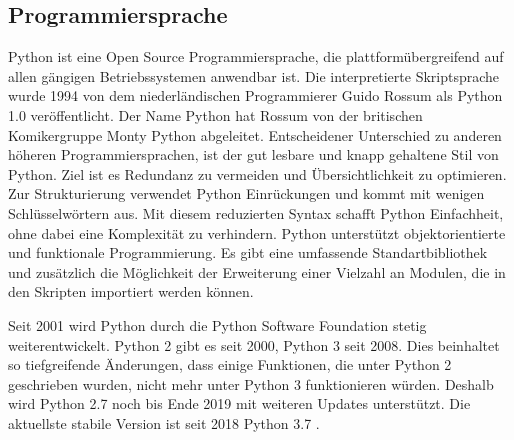 \subsection{Programmiersprache}
Python ist eine Open Source Programmiersprache, die plattformübergreifend auf allen gängigen Betriebssystemen anwendbar ist. Die interpretierte Skriptsprache wurde 1994 von dem niederländischen Programmierer Guido Rossum als Python 1.0 veröffentlicht. Der Name Python hat Rossum von der britischen Komikergruppe Monty Python abgeleitet.
Entscheidener Unterschied zu anderen höheren Programmiersprachen, ist der gut lesbare und knapp gehaltene Stil von Python. Ziel ist es Redundanz zu vermeiden und Übersichtlichkeit zu optimieren. Zur Strukturierung verwendet Python Einrückungen und kommt mit wenigen Schlüsselwörtern aus. Mit diesem reduzierten Syntax schafft Python Einfachheit, ohne dabei eine Komplexität zu verhindern. Python unterstützt objektorientierte und funktionale Programmierung. Es gibt eine umfassende  Standartbibliothek und zusätzlich die Möglichkeit der Erweiterung einer Vielzahl an Modulen, die in den Skripten importiert werden können.

Seit 2001 wird Python durch die Python Software Foundation stetig weiterentwickelt. Python 2 gibt es seit 2000, Python 3 seit 2008. Dies beinhaltet so tiefgreifende Änderungen, dass einige Funktionen, die unter Python 2 geschrieben wurden, nicht mehr unter Python 3 funktionieren würden. Deshalb wird Python 2.7 noch bis Ende 2019 mit weiteren Updates unterstützt. Die aktuellste stabile Version ist seit 2018 Python 3.7 \citep[vgl.][]{PSF2019}.


